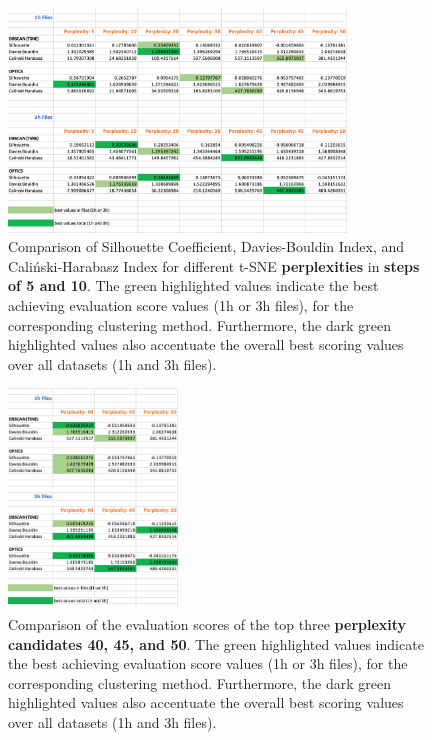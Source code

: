 \begin{figure}
  \centering
  \includegraphics[width=0.8\textwidth]{./images/tsneParametersTest/perplexity/perplexityEvaluationScores.png}
  \caption{Comparison of Silhouette Coefficient, Davies-Bouldin Index, and Caliński-Harabasz Index for different t-SNE \textbf{perplexities} in \textbf{steps of 5 and 10}. The green highlighted values indicate the best achieving evaluation score values (1h or 3h files), for the corresponding clustering method. Furthermore, the dark green highlighted values also accentuate the overall best scoring values over all datasets (1h and 3h files).}
  \label{figure:perplexityEvaluationScores}
\end{figure}

\begin{figure}
  \centering
  \includegraphics[width=0.4\textwidth]{./images/tsneParametersTest/perplexity/perplexityEvaluationScoresDetailed.png}
  \caption{Comparison of the evaluation scores of the top three \textbf{perplexity candidates 40, 45, and 50}. The green highlighted values indicate the best achieving evaluation score values (1h or 3h files), for the corresponding clustering method. Furthermore, the dark green highlighted values also accentuate the overall best scoring values over all datasets (1h and 3h files).}
  \label{figure:perplexityEvaluationScoresDetailed}
\end{figure}


